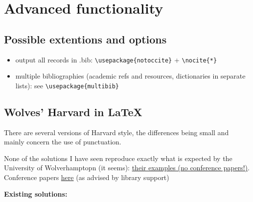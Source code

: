 \documentclass[a4paper,11pt]{article}
\begin{document}
\section{Advanced functionality}

\subsection{Possible extentions and options}

\begin{itemize}
	\item output all records in .bib: \verb|\usepackage{notoccite}| + \verb|\nocite{*}|
	\item multiple bibliographies (academic refs and resources, dictionaries in separate lists): see \verb|\usepackage{multibib}|
\end{itemize}


\subsection{Wolves' Harvard in LaTeX}

There are several versions of Harvard style, the differences being small and mainly concern the use of punctuation.

None of the solutions I have seen reproduce exactly what is expected by the University of Wolverhamptopn (it seems): \href{https://www.wlv.ac.uk/lib/media/departments/lis/skills/study-guides/LS134-Harvard-Quick-Guide-2018.pdf}{their examples (no conference papers!)}. Conference papers \href{https://www.citethemrightonline.com/comms/conferences/individual-conference-papers}{here} (as advised by library support)

\bigskip

\textbf{Existing solutions:}
\end{document}
